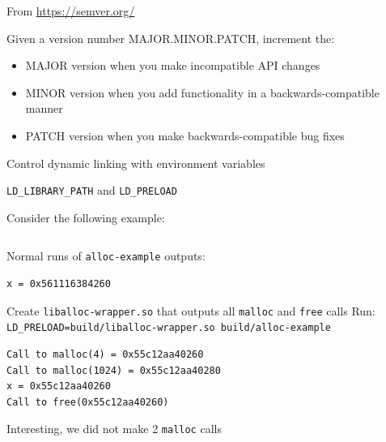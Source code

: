   \begin{slide}


    From \url{https://semver.org/}
    \medskip

    Given a version number MAJOR.MINOR.PATCH, increment the:
    \begin{itemize}
      \item MAJOR version when you make incompatible API changes
      \item MINOR version when you add functionality in a backwards-compatible
            manner
      \item PATCH version when you make backwards-compatible bug fixes
    \end{itemize}
  \end{slide}

\begin{slide}
  

  Control dynamic linking with environment variables

  \leftspace{}\texttt{LD\_LIBRARY\_PATH} and \texttt{LD\_PRELOAD}
  \medskip

  Consider the following example:

  \inputminted{c}{alloc-example.c}
\end{slide}

  \begin{slide}
    

    Normal runs of \texttt{alloc-example} outputs:
    \begin{verbatim}
x = 0x561116384260
    \end{verbatim}
    \medskip

    Create \texttt{liballoc-wrapper.so} that outputs all \texttt{malloc} and
    \texttt{free} calls \newline
    \leftspace{} Run: \texttt{LD_PRELOAD=build/liballoc-wrapper.so build/alloc-example}

    \begin{verbatim}
Call to malloc(4) = 0x55c12aa40260                  
Call to malloc(1024) = 0x55c12aa40280
x = 0x55c12aa40260
Call to free(0x55c12aa40260)
    \end{verbatim}
    \bigskip

    Interesting, we did not make 2 \texttt{malloc} calls
  \end{slide}

